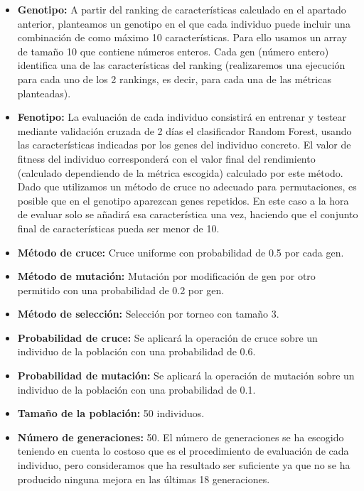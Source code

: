 \documentclass[a4paper,12pt,twoside,oldfontcommands]{memoir}
\begin{document}
\begin{itemize}
    \item \textbf{Genotipo:} A partir del ranking de características calculado en el apartado anterior, planteamos un genotipo en el que cada individuo puede incluir una combinación de como máximo 10 características. Para ello usamos un array de tamaño 10 que contiene números enteros. Cada gen (número entero) identifica una de las características del ranking (realizaremos una ejecución para cada uno de los 2 rankings, es decir, para cada una de las métricas planteadas). 
    \item \textbf{Fenotipo:} La evaluación de cada individuo consistirá en entrenar y testear mediante validación cruzada de 2 días el clasificador Random Forest, usando las características indicadas por los genes del individuo concreto. El valor de fitness del individuo corresponderá con el valor final del rendimiento (calculado dependiendo de la métrica escogida) calculado por este método. Dado que utilizamos un método de cruce no adecuado para permutaciones, es posible que en el genotipo aparezcan genes repetidos. En este caso a la hora de evaluar solo se añadirá esa característica una vez, haciendo que el conjunto final de características pueda ser menor de 10. 
    \item \textbf{Método de cruce:} Cruce uniforme con probabilidad de 0.5 por cada gen. 
    \item \textbf{Método de mutación:} Mutación por modificación de gen por otro permitido con una probabilidad de 0.2 por gen.
    \item \textbf{Método de selección: } Selección por torneo con tamaño 3. 
    \item \textbf{Probabilidad de cruce:} Se aplicará la operación de cruce sobre un individuo de la población con una probabilidad de 0.6. 
    \item \textbf{Probabilidad de mutación:} Se aplicará la operación de mutación sobre un individuo de la población con una probabilidad de 0.1. 
    \item \textbf{Tamaño de la población: } 50 individuos. 
    \item \textbf{Número de generaciones: } 50. El número de generaciones se ha escogido teniendo en cuenta lo costoso que es el procedimiento de evaluación de cada individuo, pero consideramos que ha resultado ser suficiente ya que no se ha producido ninguna mejora en las últimas 18 generaciones. 
\end{itemize}
\end{document}
